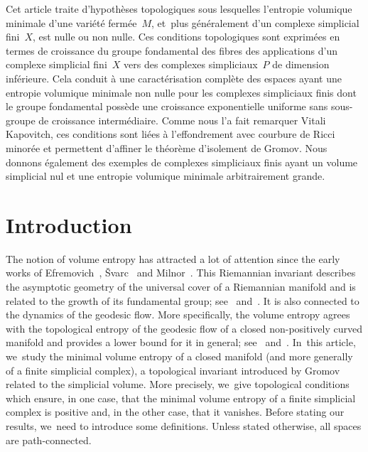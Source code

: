 \documentclass[JEP,XML,SOM,Unicode,NoFloatCountersInSection,published]{cedram}
\theoremstyle{definition}
\begin{document}
\begin{altabstract}
Cet article traite d'hypothèses topologiques sous lesquelles l'entropie volumique minimale d'une variété fermée~$M$, et~plus géné\-ralement d'un complexe simplicial fini~$X$, est nulle ou non nulle. Ces conditions topologiques sont exprimées en termes de croissance du groupe fondamental des fibres des applications d'un complexe simplicial fini~$X$ vers des complexes simpliciaux~$P$ de dimension inférieure. Cela conduit à une caractérisation complète des espaces ayant une entropie volumique minimale non nulle pour les complexes simpliciaux finis dont le groupe fondamental possède une croissance exponentielle uniforme sans sous-groupe de croissance intermédiaire. Comme nous l'a fait remarquer Vitali Kapovitch, ces conditions sont liées à l'effondrement avec courbure de Ricci minorée et permettent d'affiner le théorème d'isolement de Gromov. Nous donnons également des exemples de complexes simpliciaux finis ayant un volume simplicial nul et une entropie volumique minimale arbitrairement grande.
\end{altabstract}

\maketitle

\tableofcontents
\mainmatter

\section{Introduction}

The notion of volume entropy has attracted a lot of attention since the early works of Efremovich~\cite{Efrem53}, \v{S}varc~\cite{Shvarts55} and Milnor~\cite{Milnor68}.
This Riemannian invariant describes the asymptotic geometry of the universal cover of a Riemannian manifold and is related to the growth of its fundamental group; see~\cite{Shvarts55} and~\cite{Milnor68}.
It is also connected to the dynamics of the geodesic flow.
More specifically, the volume entropy agrees with the topological entropy of the geodesic flow of a closed non-positively curved manifold and provides a lower bound for it in general; see~\cite{Dinaburg71} and~\cite{Manning79}. In~this article, we~study the minimal volume entropy of a closed manifold (and more generally of a finite simplicial complex), a topological invariant introduced by Gromov~\cite{gro82} related to the simplicial volume.
More precisely, we~give topological conditions which ensure, in one case, that the minimal volume entropy of a finite simplicial complex is positive and, in the other case, that it vanishes.
Before stating our results, we~need to introduce some definitions.
Unless stated otherwise, all spaces are path-connected.
\end{document}
